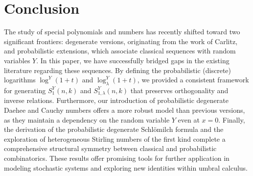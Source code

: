 \documentclass[a4paper,11pt]{amsart}
\begin{document}
\section{Conclusion}
The study of special polynomials and numbers has recently shifted toward two significant frontiers: degenerate versions, originating from the work of Carlitz, and probabilistic extensions, which associate classical sequences with random variables $Y$. In this paper, we have successfully bridged gaps in the existing literature regarding these sequences. By defining the probabilistic (discrete) logarithms $\log^{Y}(1+t)$ and $\log_{\lambda}^{Y}(1+t)$, we provided a consistent framework for generating $S_{1}^{Y}(n,k)$ and $S_{1,\lambda}^{Y}(n,k)$ that preserves orthogonality and inverse relations. Furthermore, our introduction of probabilistic degenerate Daehee and Cauchy numbers offers a more robust model than previous versions, as they maintain a dependency on the random variable $Y$ even at $x=0$. Finally, the derivation of the probabilistic degenerate Schlömilch formula and the exploration of heterogeneous Stirling numbers of the first kind complete a comprehensive structural symmetry between classical and probabilistic combinatorics. These results offer promising tools for further application in modeling stochastic systems and exploring new identities within umbral calculus.
\end{document}

